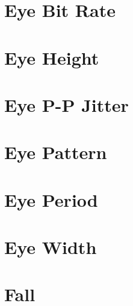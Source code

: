 \pagebreak
\section{Eye Bit Rate}

\pagebreak
\section{Eye Height}

\pagebreak
\section{Eye P-P Jitter}

\pagebreak
\section{Eye Pattern}

\pagebreak
\section{Eye Period}

\pagebreak
\section{Eye Width}

\pagebreak
\section{Fall}

\pagebreak
